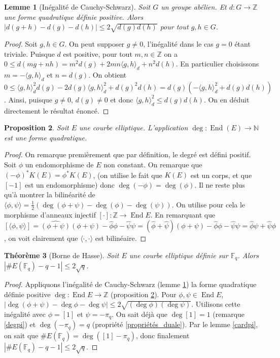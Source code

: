 \documentclass{article}
\theoremstyle{plain}%
\newtheorem{thm}{Théorème}[section]
\newtheorem{prop}[thm]{Proposition}
\newtheorem{lem}[thm]{Lemme}
\theoremstyle{definition}%
\newcommand{\F}{\mathbb{F}}
\newcommand{\Z}{\mathbb{Z}}
\newcommand{\h}{\widehat}
\DeclareMathOperator{\End}{End}
\begin{document}
\begin{lem}[Inégalité de Cauchy-Schwarz]
  \label{Cauchy-Schwarz}
  Soit $G$ un groupe abélien. Et $d:G\to \mathbb Z$ une forme quadratique définie positive. Alors $|d(g+h) - d(g) -d(h)|\le 2\sqrt{d(g)d(h)}$ pour tout $g, h\in G$.  
\end{lem}

\begin{proof}
    Soit $g, h\in G$. On peut supposer $g\neq 0$, l'inégalité dans le cas $g=0$ étant triviale. Puisque $d$ est positive, pour tout $m, n\in \Z$ on a $0 \le d(mg + nh) = m^2d(g) + 2mn\langle g, h\rangle_d + n^2d(h)$. En particulier choisissons $m = -\langle g, h\rangle_d$ et $n=d(g)$. On obtient $0 \le  \langle g, h\rangle_d^2d(g) -2d(g)\langle g, h\rangle_d^2 + d(g)^2d(h) = d(g)(-\langle g, h\rangle_d^2 + d(g)d(h))$. Ainsi, puisque $g\neq 0$, $d(g)\neq 0$ et donc $\langle g, h\rangle_d^2 \le d(g)d(h)$. On en déduit directement le résultat énoncé.
  \end{proof}


\begin{prop}
  \label{degré_quadratique}
  Soit $E$ une courbe elliptique. L'application $\deg : \End(E) \to \mathbb N$ est une forme quadratique.
\end{prop}

\begin{proof}
  On remarque premièrement que par définition, le degré est défini positif. Soit $\phi$ un endomorphisme de $E$ non constant. On remarque que $(-\phi)^*K(E) = \phi^*K(E)$, (on utilise le fait que $K(E)$ est un corps, et que $[-1]$ est un endomorphisme) donc $\deg(-\phi) = \deg(\phi)$. Il ne reste plus qu'à montrer la bilinéarité de $\langle \phi, \psi\rangle = \frac{1}{2}(\deg(\phi+\psi) - \deg(\phi) -\deg(\psi))$. On utilise pour cela le morphisme d'anneaux injectif $[\cdot] :\Z\to \End E$. En remarquant que $[\langle \phi, \psi\rangle] = \h{(\phi + \psi)}(\phi + \psi) - \h\phi\phi -\h\psi\psi =  (\h\phi + \h\psi)(\phi + \psi) - \h\phi\phi -\h\psi\psi = \h\phi\psi + \h\psi\phi$, on voit clairement que $\langle\cdot,\cdot\rangle$ est bilinéaire.
\end{proof}

\begin{thm}[Borne de Hasse]
  \label{hasse}
  Soit $E$ une courbe elliptique définie sur $\F_q$. Alors $|\#E(\F_q) - q -1|\le 2\sqrt{q}$.
\end{thm}

\begin{proof}
  Appliquons l'inégalité de Cauchy-Schwarz (lemme \ref{Cauchy-Schwarz})  la forme quadratique définie positive $\deg : \End E \to \Z$ (proposition \ref{degré_quadratique}). Pour $\phi, \psi\in \End E$, $|\deg(\phi+\psi) - \deg\phi -\deg\psi| \le 2\sqrt{(\deg\phi)(\deg\psi)}$. Utilisons cette inégalité avec $\phi = [1]$ et $\psi = -\pi_q$. On sait déjà que $\deg[1] = 1$ (remarque \ref{degpi}) et $\deg(-\pi_q) = q$ (propriété \ref{propriétés_duale}). 
  Par le lemme \ref{cardpi}, on sait que $\#E(\F_q) = \deg([1] - \pi_q)$, donc finalement $|\#E(\F_q)-q-1| \le 2\sqrt{q}$.
\end{proof}
\end{document}

